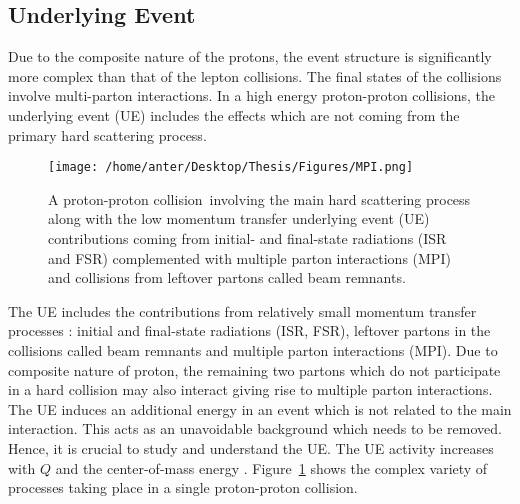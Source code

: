 \subsection{Underlying Event}
Due to the composite nature of the protons, the event structure is significantly more complex than that of the lepton collisions. The final states of the collisions involve multi-parton interactions. In a high energy proton-proton collisions, the underlying event (UE) includes the effects which are not coming from the primary hard scattering process. \begin{figure}[!h]
\begin{center}
\hspace*{-7mm}
\texttt{[image: /home/anter/Desktop/Thesis/Figures/MPI.png]}\\
\vspace*{4mm}
\caption[A proton-proton collision involving the main hard scattering process along with the low momentum transfer underlying event (UE) contributions.]{A proton-proton collision\footnotemark~involving the main hard scattering process along with the low momentum transfer underlying event (UE) contributions coming from initial- and final-state radiations (ISR and FSR) complemented with multiple parton interactions (MPI) and collisions from leftover partons called beam remnants.}
\label{fig:MPI}
\end{center}
\end{figure}The UE includes the contributions from relatively small momentum transfer processes : initial and final-state radiations (ISR, FSR), leftover partons in the collisions called beam remnants and multiple parton interactions (MPI). Due to composite nature of proton, the remaining two partons which do not participate in a hard collision may also interact giving rise to multiple parton interactions. The UE induces an additional energy in an event which is not related to the main interaction. This acts as an unavoidable background which needs to be removed. Hence, it is crucial to study and understand the UE. The UE activity increases with $Q$ and the center-of-mass energy \cme. Figure~\ref{fig:MPI} shows the complex variety of processes taking place in a single proton-proton collision.

